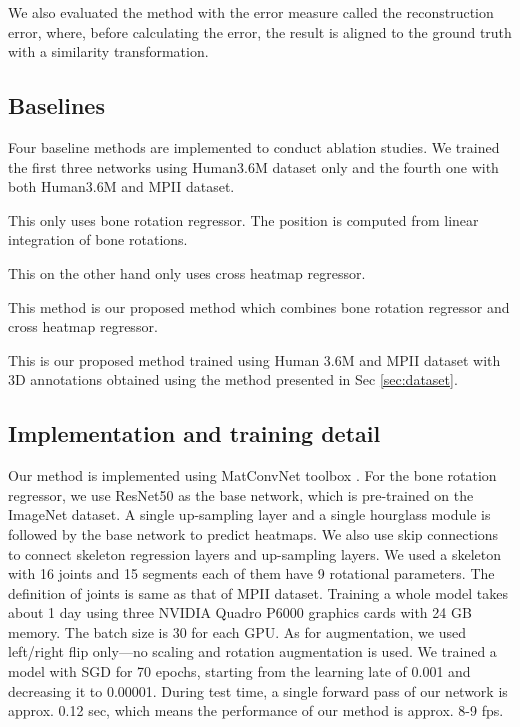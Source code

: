 We also evaluated the method with the error measure called the reconstruction error, where, before calculating the error, the result is aligned to the ground truth with a similarity transformation. 



\subsection{Baselines}
Four baseline methods are implemented to conduct ablation studies. We trained the first three networks using Human3.6M dataset only and the fourth one with both Human3.6M and MPII dataset. 

 This only uses bone rotation regressor. The position is computed from linear integration of bone rotations. 

 This on the other hand only uses cross heatmap regressor.  

 This method is our proposed method which combines bone rotation regressor and cross heatmap regressor.

 This is our proposed method trained using Human 3.6M and MPII dataset with 3D annotations obtained using the method presented in Sec \ref{sec:dataset}.   


\subsection{Implementation and training detail}
Our method is implemented using MatConvNet toolbox \cite{vedaldi15matconvnet}. For the bone rotation regressor, we use ResNet50 \cite{DBLP:journals/corr/HeZRS15} as the base network, which is pre-trained on the ImageNet dataset. A single up-sampling layer and a single hourglass module is followed by the base network to predict heatmaps. We also use skip connections to connect skeleton regression layers and up-sampling layers. We used a skeleton with 16 joints and 15 segments each of them have 9 rotational parameters. The definition of joints is same as that of MPII dataset. Training a whole model takes about 1 day using three NVIDIA Quadro P6000 graphics cards with 24 GB memory. The batch size is 30 for each GPU. As for augmentation, we used left/right flip only---no scaling and rotation augmentation is used. We trained a model with SGD for 70 epochs, starting from the learning late of 0.001 and decreasing it to 0.00001. During test time, a single forward pass of our network is approx. 0.12 sec, which means the performance of our method is approx. 8-9 fps.    

